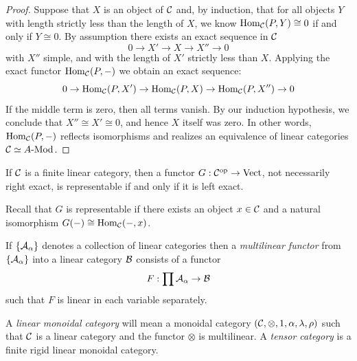 \documentclass{amsart}
\begin{document}
\begin{proof}
Suppose that $X$ is an object of $\mathcal C$ and, by induction, that for all objects $Y$ with length strictly less than the length of $X$, we know $\operatorname{Hom}_{\mathcal C}(P,Y) \cong 0$ if and only if $Y \cong 0$. By assumption there exists an exact sequence in $\mathcal C$
\begin{equation*}
	0 \to X' \to X \to X'' \to 0
\end{equation*}
with $X''$ simple, and with the length of $X'$ strictly less than $X$. Applying the exact functor $\operatorname{Hom}_{\mathcal C}(P,-)$ we obtain an exact sequence:
\begin{equation*}
	0 \to \operatorname{Hom}_{\mathcal C}(P,X') \to \operatorname{Hom}_{\mathcal C}(P,X) \to \operatorname{Hom}_{\mathcal C}(P,X'') \to 0
\end{equation*}
If the middle term is zero, then all terms vanish. By our induction hypothesis, we conclude that $X'' \cong X' \cong 0$, and hence $X$ itself was zero. In other words, $\operatorname{Hom}_{\mathcal C}(P,-)$ reflects isomorphisms and realizes an equivalence of linear categories $\cC \simeq \Mod{A}{}$.
\end{proof}

\begin{lemma} \label{lma:left_exact=linear}
	If $\mathcal C$ is a finite linear category, then a  functor $G: \mathcal C^{\mathrm{op}} \to \mathrm{Vect}$, not necessarily right exact, is representable if and only if it is left exact. 
\end{lemma}

\noindent Recall that $G$ is representable if there exists an object $x \in \mathcal C$ and a natural isomorphism $G(-) \cong \operatorname{Hom}_{\mathcal C}(-, x)$. 

	
If $\{\mathcal A_\alpha\}$ denotes a collection of linear categories then a {\em multilinear functor} from $\{\mathcal A_\alpha\}$ into a linear category $\mathcal B$ consists of a functor
\begin{equation*}
	F: \prod \mathcal A_\alpha \to \mathcal B
\end{equation*}
such that $F$ is linear in each variable separately. 



\begin{definition}
	A {\em linear monoidal category} will mean a monoidal category $(\mathcal C, \otimes, 1, \alpha, \lambda, \rho)$ such that $\mathcal C$ is a linear category and the functor $\otimes$ is multilinear. A {\em tensor category} is a finite rigid linear monoidal category.  
\end{definition}
\end{document}

